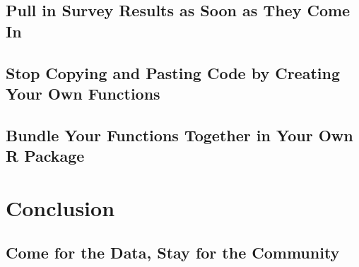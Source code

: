 \documentclass[
]{book}
\begin{document}
\hypertarget{pull-in-survey-results-as-soon-as-they-come-in}{%
\chapter*{Pull in Survey Results as Soon as They Come In}\label{pull-in-survey-results-as-soon-as-they-come-in}}

\hypertarget{stop-copying-and-pasting-code-by-creating-your-own-functions}{%
\chapter*{Stop Copying and Pasting Code by Creating Your Own Functions}\label{stop-copying-and-pasting-code-by-creating-your-own-functions}}

\hypertarget{bundle-your-functions-together-in-your-own-r-package}{%
\chapter*{Bundle Your Functions Together in Your Own R Package}\label{bundle-your-functions-together-in-your-own-r-package}}

\hypertarget{part-conclusion}{%
\part*{Conclusion}\label{part-conclusion}}

\hypertarget{come-for-the-data-stay-for-the-community}{%
\chapter*{Come for the Data, Stay for the Community}\label{come-for-the-data-stay-for-the-community}}
\end{document}
